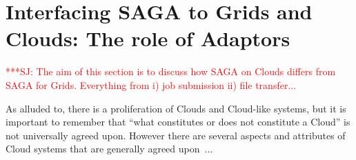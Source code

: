 \documentclass[conference,final]{IEEEtran}
\newcommand{\jhanote}[1]{ {\textcolor{red} { ***SJ: #1 }}}
\newcommand{\jhanote}[1]{}
\newcommand{\sagamapreduce }{SAGA-MapReduce }
\begin{document}
\section{Interfacing SAGA to Grids and Clouds: The role of Adaptors}

\jhanote{The aim of this section is to discuss how SAGA on Clouds
  differs from SAGA for Grids. Everything from i) job submission ii)
  file transfer...}

As alluded to, there is a proliferation of Clouds and Cloud-like
systems, but it is important to remember that ``what constitutes or
does not constitute a Cloud'' is not universally agreed upon.  However
there are several aspects and attributes of Cloud systems that are
generally agreed upon~\cite{buyya_hpcc}...


\end{document}

